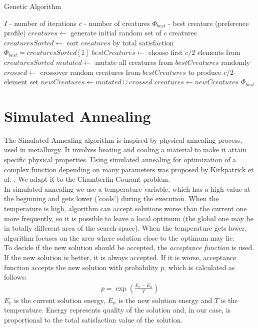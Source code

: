 \begin{algorithm}
\caption{Genetic Algorithm}\label{euclid}
\begin{algorithmic}[1]
		\State $I$ - number of iterations
		\State $c$ - number of creatures
		\State $\Phi_{best}$ - best creature (preference profile)
		\State $creatures \gets$ generate initial random set of $c$ creatures
			\State $creaturesSorted \gets$ sort $creatures$ by total satisfaction
				\State $\Phi_{best} = creaturesSorted[1]$
			\EndIf
			\State $bestCreatures \gets$ choose first $c/2$ elements from $creaturesSorted$
			\State $mutated \gets$ mutate all creatures from $bestCreatures$ randomly
			\State $crossed \gets$ crossover random creatures from $bestCreatures$ to produce $c/2$-element set
			\State $newCreatures \gets mutated \cup crossed$
			\State $creatures \gets newCreatures$
		\EndFor
		\State \Return $\Phi_{best}$
	\EndProcedure
\end{algorithmic}
\end{algorithm}

\section{Simulated Annealing}

The Simulated Annealing algorithm is inspired by physical annealing process, used in metallurgy. It involves heating and cooling a material to make it attain specific physical properties. Using simulated annealing for optimization of a complex function depending on many parameters was proposed by Kirkpatrick et al. \cite{7}. We adapt it to the Chamberlin-Courant problem.
\\

In simulated annealing we use a temperature variable, which has a high value at the beginning and gets lower ('cools') during the execution. When the temperature is high, algorithm can accept solutions worse than the current one more frequently, so it is possible to leave a local optimum (the global one may be in totally different area of the search space). When the temperature gets lower, algorithm focuses on the area where solution close to the optimum may lie.
\\

To decide if the new solution should be accepted, the \textit{acceptance function} is used. If the new solution is better, it is always accepted. If it is worse, acceptance function accepts the new solution with probability $p$, which is calculated as follows:
\begin{gather}
	p = \exp(\frac{E_{c}-E_{n}}{T})
\end{gather}
$E_{c}$ is the current solution energy, $E_{n}$ is the new solution energy and $T$ is the temperature. Energy represents quality of the solution and, in our case, is proportional to the total satisfaction value of the solution.
\\

